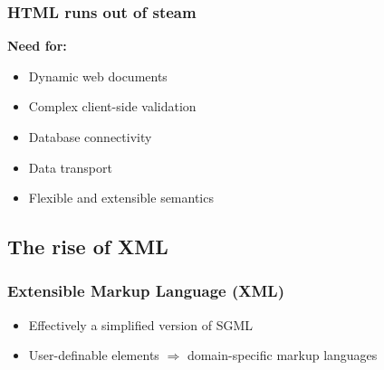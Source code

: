 \usebackgroundtemplate{}





\frame
{
	\frametitle{HTML runs out of steam}
	
	\textbf{Need for:}
	
	\begin{itemize}
	
		\item Dynamic web documents
		
		
		\item Complex client-side validation
		
		
		\item Database connectivity
		
		\item Data transport
		
		\item Flexible and extensible semantics
		
	\end{itemize}

}

\usebackgroundtemplate{}




\subsection*{The rise of XML}




\frame
{
	\frametitle{Extensible Markup Language (XML)}
	
	\begin{itemize}
	
		\item Effectively a simplified version of SGML
		
		\item User-definable elements \(\Rightarrow\) domain-specific
		markup languages
		
	\end{itemize}

	
	\note{~}
}


